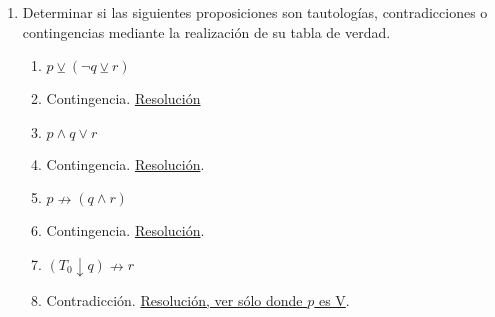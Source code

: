 \documentclass[a4paper]{article}
\newcommand{\answer}{\item[**]}
\newcommand{\exercise}{\item}
\newcommand{\then}{\to}
\newcommand{\eq}{\leftrightarrow}
\newcommand{\xor}{\veebar}
\newcommand{\nor}{\downarrow}
\newcommand{\nimply}{\nrightarrow}
\begin{document}
\begin{enumerate}[resume]
\begin{multicols}{2}
\begin{enumerate} [label=(\alph*)]
		\item Vine en tren y suspendieron el servicio, así que tengo que volver en colectivo o caminando.
		\answer $( p  \land  q ) \then  ( r \lor  s )$ con $p$:"\textit{Vine en tren}", $q$:"\textit{Suspendieron el servicio}", $r$:"\textit{Tengo que volver en colectivo}" y $s$:"\textit{Tengo que volver caminando}".

		\item En un juego son importantes las mecánicas y la historia. Las mecánicas mantienen a la persona jugadora activa. La historia la mantiene interesada. 
		\answer $( p  \land  q )  \land  r  \land  s $. $p$:"\textit{En un juego son importantes las mecánicas}", $q$:"\textit{En un juego es importantes la historia}", $r$:"\textit{Las mecánicas mantienen a la persona jugadora activa}" y $s$:"\textit{La historia la mantiene interesada}".

		\item Decir que los fantasmas se ponen azules cuando el pacman come la fruta, es lo mismo que decir que los fantasmas están azules o el pacman no se comió la fruta. 
		\answer $( q \then  p ) \eq  ( p \lor  \neg q)$ con $p$:"\textit{Los fantasmas se ponen azules}" y $q$:"\textit{El pacman come la fruta}".

	\end{enumerate}
	\end{multicols}

	\exercise Determinar si las siguientes proposiciones son tautologías, contradicciones o contingencias mediante la realización de su tabla de verdad. 
	\begin{multicols}{2}
	\begin{enumerate} [label=(\alph*)]
		\item $p \xor  (\neg q \xor  r)$
		\answer Contingencia. \href{https://www.wolframalpha.com/input?i=p+or++%28not+q+xor++r%29}{Resolución}

		\item $p \land  q \lor  r$
		\answer Contingencia. \href{https://www.wolframalpha.com/input?i=p+and++q+or++r}{Resolución}.

		\item $p \nimply (q \land  r)$
		\answer Contingencia. \href{https://www.wolframalpha.com/input?i=not+%28p+%3D%3E+%28q+and++r%29%29}{Resolución}.

		\item $(T_0 \nor q) \nimply r$
		\answer Contradicción. \href{https://www.wolframalpha.com/input?i=not+%28%28p+nor+q%29+%3D%3E+r%29}{Resolución, ver sólo donde $p$ es V}.


\end{enumerate}
\end{multicols}
\end{enumerate}
\end{document}
